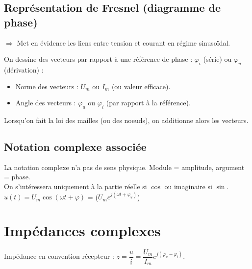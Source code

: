 \documentclass[13pt, twoside, a4paper, french]{report}
\begin{document}
    \subsection{Représentation de Fresnel (diagramme de phase)}\label{subsec:representation-de-fresnel-(diagramme-de-phase)}

    $\Rightarrow$ Met en évidence les liens entre tension et courant en régime sinusoïdal.

    \vspace{5pt}
    On dessine des vecteurs par rapport à une référence de phase : $\varphi_i$ (série) ou $\varphi_u$ (dérivation) :
    \begin{itemize}
        \item Norme des vecteurs : $U_m$ ou $I_m$ (ou valeur efficace).
        \item Angle des vecteurs : $\varphi_u$ ou $\varphi_i$ (par rapport à la référence).
    \end{itemize}
    \vspace{5pt}
    Lorsqu'on fait la loi des mailles (ou des noeuds), on additionne alors les vecteurs.

    \subsection{Notation complexe associée}\label{subsec:notation-complexe-associée}

    La notation complexe n'a pas de sens physique.
    Module = amplitude, argument = phase.\\
    On s'intéressera uniquement à la partie réelle si $\cos$ ou imaginaire si $\sin$.\\

    $u(t) = U_m \cos(\omega t + \varphi)$ = \Re($U_m e^{j(\omega t + \varphi_u)}$)



    \section{Impédances complexes}\label{sec:impedances-complexes}

    Impédance en convention récepteur : $\underline{z} = \dfrac{\underline{u}}{\underline{i}} = \dfrac{U_m}{I_m} e^{j(\varphi_u - \varphi_i)}$.\\
\end{document}
